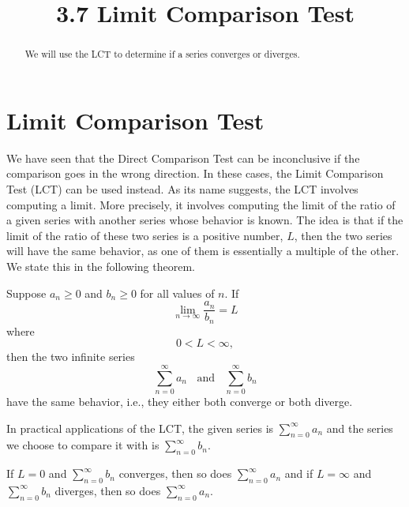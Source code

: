 \documentclass[handout]{ximera}
\title{3.7 Limit Comparison Test}
\begin{document}
\begin{abstract}
We will use the LCT to determine if a series converges or diverges.
\end{abstract}

\maketitle

\section{Limit Comparison Test}
We have seen that the Direct Comparison Test can be inconclusive if the comparison goes in the wrong direction. 
In these cases, the Limit Comparison Test (LCT) can be used instead.
As its name suggests, the LCT involves computing a limit. More precisely, it involves computing the limit of the ratio of a given series with 
another series whose behavior is known.  The idea is that if the limit of the ratio of these two series is a positive number, $L$, then the two series
will have the same behavior, as one of them is essentially a multiple of the other. We state this in the following theorem.

\begin{theorem}
Suppose $a_n \geq 0$ and $b_n \geq 0$ for all values of $n$.
If 
\[
\lim_{n \to \infty} \frac{a_n}{b_n} = L
\]
where
\[
0<L<\infty,
\]
then the two infinite series 
\[
\sum_{n=0}^\infty a_n \;\; \text{ and } \;\; \sum_{n=0}^\infty b_n
\]
have the same behavior, i.e., they either both converge or both diverge.
\end{theorem}


\begin{remark}
In practical applications of the LCT, the given series is $\displaystyle{\sum_{n=0}^\infty a_n}$
and the series we choose to compare it with is $\displaystyle{\sum_{n=0}^\infty b_n}$.
\end{remark}


\begin{remark}
If $L = 0$ and $\displaystyle{\sum_{n=0}^\infty b_n}$ converges, then so does $\displaystyle{\sum_{n=0}^\infty a_n}$
and if $L = \infty$ and $\displaystyle{\sum_{n=0}^\infty b_n}$ diverges, then so does $\displaystyle{\sum_{n=0}^\infty a_n}$.
\end{remark}
\end{document}
